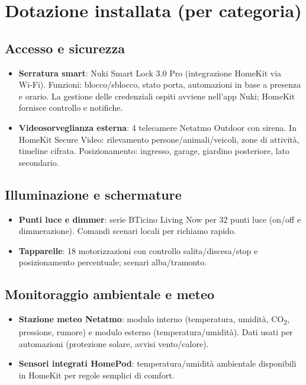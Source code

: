 \section{Dotazione installata (per categoria)}
\subsection*{Accesso e sicurezza}
\begin{itemize}
  \item \textbf{Serratura smart}: Nuki Smart Lock 3.0 Pro (integrazione HomeKit via Wi‑Fi). Funzioni: blocco/sblocco, stato porta, automazioni in base a presenza e orario. La gestione delle credenziali ospiti avviene nell’app Nuki; HomeKit fornisce controllo e notifiche.
  \item \textbf{Videosorveglianza esterna}: 4 telecamere Netatmo Outdoor con sirena. In HomeKit Secure Video: rilevamento persone/animali/veicoli, zone di attività, timeline cifrata. Posizionamento: ingresso, garage, giardino posteriore, lato secondario.
\end{itemize}

\subsection*{Illuminazione e schermature}
\begin{itemize}
  \item \textbf{Punti luce e dimmer}: serie BTicino Living Now per 32 punti luce (on/off e dimmerazione). Comandi scenari locali per richiamo rapido.
  \item \textbf{Tapparelle}: 18 motorizzazioni con controllo salita/discesa/stop e posizionamento percentuale; scenari alba/tramonto.
\end{itemize}

\subsection*{Monitoraggio ambientale e meteo}
\begin{itemize}
  \item \textbf{Stazione meteo Netatmo}: modulo interno (temperatura, umidità, CO\textsubscript{2}, pressione, rumore) e modulo esterno (temperatura/umidità). Dati usati per automazioni (protezione solare, avvisi vento/calore).
  \item \textbf{Sensori integrati HomePod}: temperatura/umidità ambientale disponibili in HomeKit per regole semplici di comfort.
\end{itemize}

